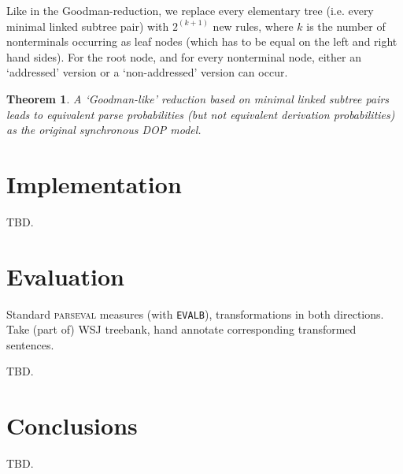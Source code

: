 \documentclass[a4paper]{article}
\newtheorem{theorem}{Theorem}[section]
\theoremstyle{definition}
\begin{document}
Like in the Goodman-reduction, we replace every elementary tree (i.e. every
minimal linked subtree pair) with $2^{(k+1)}$ new rules, where $k$ is the
number of nonterminals occurring as leaf nodes (which has to be equal on the
left and right hand sides). For the root node, and for every nonterminal node,
either an `addressed' version or a `non-addressed' version can occur.

\begin{theorem}
A `Goodman-like' reduction based on minimal linked subtree pairs leads to
equivalent parse probabilities (but not equivalent derivation probabilities) as
the original synchronous DOP model.
\end{theorem}

\section{Implementation}
\label{sec:implem}

TBD.

\section{Evaluation}
\label{sec:eval}

Standard \textsc{parseval} measures (with \texttt{EVALB}), transformations in both
directions. Take (part of) WSJ treebank, hand annotate corresponding transformed
sentences.

TBD. 

\section{Conclusions}

TBD.

\label{sec:conc}

\end{document}
